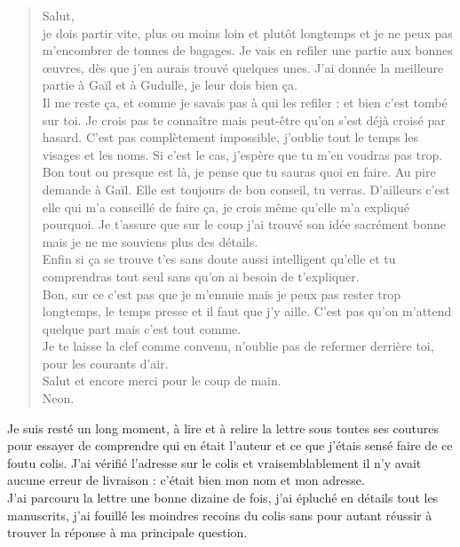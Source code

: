\begin{quote}
Salut, \\

je dois partir vite, plus ou moins loin et plutôt longtemps et je ne peux pas m'encombrer de tonnes de bagages. Je vais en refiler une partie aux bonnes œuvres, dès que j'en aurais trouvé quelques unes. J'ai donnée la meilleure partie à Gaïl et à Gudulle, je leur dois bien ça. \\

Il me reste ça, et comme je savais pas à qui les refiler : et bien c'est tombé sur toi. Je crois pas te connaître mais peut-être qu'on s'est déjà croisé par hasard. C'est pas complètement impossible, j'oublie tout le temps les visages et les noms. Si c'est le cas, j'espère que tu m'en voudras pas trop. \\
Bon tout ou presque est là, je pense que tu sauras quoi en faire. Au pire demande à Gaïl. Elle est toujours de bon conseil, tu verras. D'ailleurs c'est elle qui m'a conseillé de faire ça, je crois même qu'elle m'a expliqué pourquoi. Je t'assure que sur le coup j'ai trouvé son idée sacrément bonne mais je ne me souviens plus des détails. \\
Enfin si ça se trouve t'es sans doute aussi intelligent qu'elle et tu comprendras tout seul sans qu'on ai besoin de t'expliquer. \\

Bon, sur ce c'est pas que je m'ennuie mais je peux pas rester trop longtemps, le temps presse et il faut que j'y aille. C'est pas qu'on m'attend quelque part mais c'est tout comme.\\

Je te laisse la clef comme convenu, n'oublie pas de refermer derrière toi, pour les courants d'air.\\

Salut et encore merci pour le coup de main.\\
Neon.\\
\end{quote}

Je suis resté un long moment, à lire et à relire la lettre sous toutes ses coutures pour essayer de comprendre qui en était l'auteur et ce que j'étais sensé faire de ce foutu colis. J'ai vérifié l'adresse sur le colis et vraisemblablement il n'y avait aucune erreur de livraison : c'était bien mon nom et mon adresse. \\

J'ai parcouru la lettre une bonne dizaine de fois, j'ai épluché en détails tout les manuscrits, j'ai fouillé les moindres recoins du colis sans pour autant réussir à trouver la réponse à ma principale question.\\

